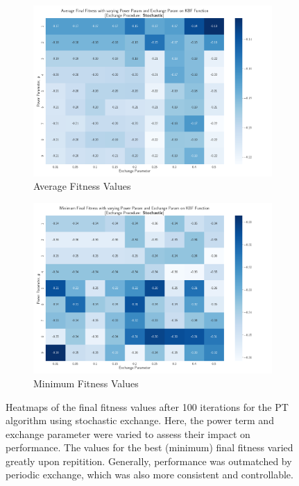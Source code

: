 \documentclass[10pt]{article}
\begin{document}
\begin{multicols}{2}
\begin{figure}[H]
    \centering
    \begin{subfigure}{0.48\textwidth}
        \centering
        \includegraphics[width=\textwidth]{../figures/Permanent Images/PT_Avg_Fitness_Heatmap_Stochastic.png}
        \caption{Average Fitness Values}
        \label{fig:avg_stochastic_heatmap}
    \end{subfigure}
    \begin{subfigure}{0.48\textwidth}
        \centering
        \includegraphics[width=\textwidth]{../figures/Permanent Images/PT_Min_Fitness_Heatmap_Stochastic.png}
        \caption{Minimum Fitness Values}
        \label{fig:min_stochastic_heatmap}
    \end{subfigure}
    \captionsetup{justification=centering}
    \caption{Heatmaps of the final fitness values after 100 iterations for the PT algorithm using stochastic exchange. Here, the power term and exchange parameter were varied to assess their impact on performance. The values for the best (minimum) final fitness varied greatly upon repitition. Generally, performance was outmatched by periodic exchange, which was also more consistent and controllable.}
    \label{fig:heatmap_stochastic}
\end{figure}
\end{multicols}
\end{document}
